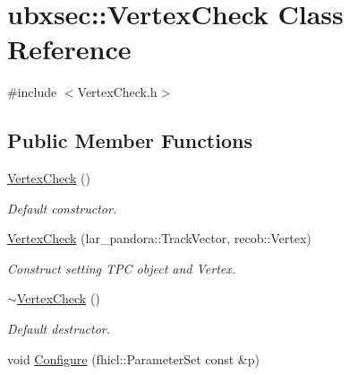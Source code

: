\hypertarget{classubxsec_1_1VertexCheck}{\section{ubxsec\-:\-:Vertex\-Check Class Reference}
\label{classubxsec_1_1VertexCheck}
}


{\ttfamily \#include $<$Vertex\-Check.\-h$>$}

\subsection*{Public Member Functions}
\begin{DoxyCompactItemize}
\item 
\hypertarget{classubxsec_1_1VertexCheck_af6ef46e3fc198a067987f64ef863aa45}{\hyperlink{classubxsec_1_1VertexCheck_af6ef46e3fc198a067987f64ef863aa45}{Vertex\-Check} ()}\label{classubxsec_1_1VertexCheck_af6ef46e3fc198a067987f64ef863aa45}

\begin{DoxyCompactList}\small\item\em Default constructor. \end{DoxyCompactList}\item 
\hypertarget{classubxsec_1_1VertexCheck_af1d0f2f6c434db12aee3c8ae4b810da8}{\hyperlink{classubxsec_1_1VertexCheck_af1d0f2f6c434db12aee3c8ae4b810da8}{Vertex\-Check} (lar\-\_\-pandora\-::\-Track\-Vector, recob\-::\-Vertex)}\label{classubxsec_1_1VertexCheck_af1d0f2f6c434db12aee3c8ae4b810da8}

\begin{DoxyCompactList}\small\item\em Construct setting T\-P\-C object and Vertex. \end{DoxyCompactList}\item 
\hypertarget{classubxsec_1_1VertexCheck_a31f02bd272b70d96d3e20be2519c5b74}{\hyperlink{classubxsec_1_1VertexCheck_a31f02bd272b70d96d3e20be2519c5b74}{$\sim$\-Vertex\-Check} ()}\label{classubxsec_1_1VertexCheck_a31f02bd272b70d96d3e20be2519c5b74}

\begin{DoxyCompactList}\small\item\em Default destructor. \end{DoxyCompactList}\item 
\hypertarget{classubxsec_1_1VertexCheck_aa2b80d7c8c6eb06d53d44f5ea2810b22}{void \hyperlink{classubxsec_1_1VertexCheck_aa2b80d7c8c6eb06d53d44f5ea2810b22}{Configure} (fhicl\-::\-Parameter\-Set const \&p)}\label{classubxsec_1_1VertexCheck_aa2b80d7c8c6eb06d53d44f5ea2810b22}


\end{DoxyCompactItemize}
